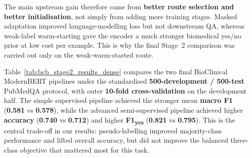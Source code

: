\documentclass{article}
\begin{document}
\begin{table}[H]
\centering
\caption{Upstream route-selection summary for BioClinical ModernBERT. }
\label{tab:bcb_upstream_summary}
\small
{}
\end{table}

The main upstream gain therefore came from \textbf{better route selection and better initialisation}, not simply from adding more training stages. Masked adaptation improved language-modelling loss but not downstream QA, whereas weak-label warm-starting gave the encoder a much stronger biomedical yes/no prior at low cost per example. This is why the final Stage~2 comparison was carried out only on the weak-warm-started route.

Table~\ref{tab:bcb_stage2_results_dense} compares the two final BioClinical ModernBERT pipelines under the standardised \textbf{500-development / 500-test} PubMedQA protocol, with outer \textbf{10-fold cross-validation} on the development half. The simple supervised pipeline achieved the stronger mean \textbf{macro F1} (\textbf{0.581} vs \textbf{0.578}), while the advanced semi-supervised pipeline achieved higher \textbf{accuracy} (\textbf{0.740} vs \textbf{0.712}) and higher \textbf{F1\textsubscript{yes}} (\textbf{0.821} vs \textbf{0.795}). This is the central trade-off in our results: pseudo-labelling improved majority-class performance and lifted overall accuracy, but did not improve the balanced three-class objective that mattered most for this task.

\begin{table}[H]
\centering
\caption{Stage~2 development-side results for BioClinical ModernBERT. Values are mean $\pm$ standard deviation across outer folds.}
\label{tab:bcb_stage2_results_dense}
\small
{}
\end{table}
\end{document}

